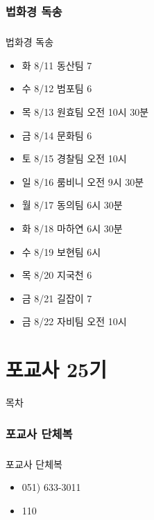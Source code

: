 \documentclass[aspectratio=1610,14pt,xcolor=pdftex,dvipsnames,table,handout]{beamer}
\begin{document}
		\section{ 법화경 독송 }
		\begin{frame} [t,plain]
		\frametitle{ }
			\begin{block} { 법화경 독송 }
			\setlength{\leftmargini}{2em}			
			\begin{itemize}
				\item 화 8/11 동산팀 7
				\item 수 8/12 범포팀 6
				\item 목 8/13 원효팀 오전 10시 30분 
				\item 금 8/14 문화팀 6
				\item 토 8/15 경찰팀 오전 10시 
				\item 일 8/16 룸비니 오전 9시 30분
				\item 월 8/17 동의팀 6시 30분
				\item 화 8/18 마하연 6시 30분
				\item 수 8/19 보현팀 6시 
				\item 목 8/20 지국천 6
				\item 금 8/21 길잡이 7
				\item 금 8/22 자비팀 오전 10시
			\end{itemize}
			\end{block}						
								
		\end{frame}						




		\part{ 포교사 25기 }
		\frame{\partpage}

		\begin{frame} [plain]{목차}
		\tableofcontents%
		\end{frame}


		\section{ 포교사 단체복 }
		\begin{frame} [t,plain]
		\frametitle{ }
			\begin{block} { 포교사 단체복 }
			\setlength{\leftmargini}{5em}			
			\begin{itemize}
				\item [전번] 051) 633-3011
				\item [사이즈] 110
			\end{itemize}
			\end{block}						
								
		\end{frame}						
\end{document}
